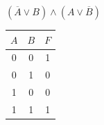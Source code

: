     \begin{minipage}[t]{0.3\textwidth}
        \centering
        \begin{enumerate}
            \setcounter{enumi}{5}
            \begin{spacing}{1.2}
                \item $(\overline A \vee B) \wedge (A \vee \overline B)$\\
            \end{spacing}
            \begin{tabular}{|c|c|c|}
                \hline
                $A$ & $B$ & $F$ \\
                \hline
                0   & 0   & 1   \\
                \hline
                0   & 1   & 0   \\
                \hline
                1   & 0   & 0   \\
                \hline
                1   & 1   & 1   \\
                \hline
            \end{tabular}
        \end{enumerate}
    \end{minipage}


